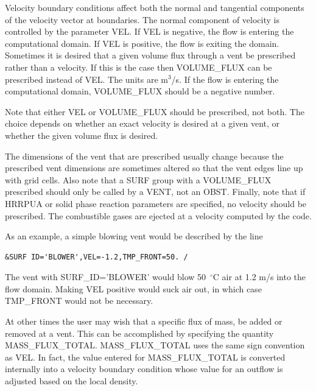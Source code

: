 \documentclass[11pt]{book}
\begin{document}
Velocity boundary conditions affect both the normal and tangential
components of the velocity vector at boundaries.
The normal component of velocity is controlled by the parameter
{\ct VEL}. If {\ct VEL} is negative, the flow is entering the
computational domain. If {\ct VEL} is positive, the flow is exiting the
domain.
Sometimes it is desired that a given volume flux through a vent
be prescribed rather than a velocity. If this is the case then
{\ct VOLUME\_FLUX} can be prescribed instead of {\ct VEL}. The units
are m$^3$/s.
If the flow is entering the computational domain, {\ct VOLUME\_FLUX}
should be a negative number.
\begin{warning}
\noindent
Note that either {\ct VEL} or {\ct VOLUME\_FLUX} should be prescribed,
not both.  The choice depends on whether an exact velocity is desired at a
given vent, or whether the given volume flux is desired.
\end{warning}
The dimensions of the vent that are prescribed usually change
because the prescribed vent dimensions are sometimes altered so that
the vent edges line up with grid cells. Also note that a {\ct SURF}
group with a {\ct VOLUME\_FLUX} prescribed should only be called by a
{\ct VENT}, not an {\ct OBST}.
Finally, note that if {\ct HRRPUA} or solid phase reaction parameters are
specified, no velocity should be prescribed. The combustible gases
are ejected at a velocity computed by the code.

As an example, a simple blowing vent would be described by the line

\footnotesize
\begin{verbatim}
&SURF ID='BLOWER',VEL=-1.2,TMP_FRONT=50. /
\end{verbatim}
\normalsize

\noindent
The vent with {\ct SURF\_ID='BLOWER'} would blow 50~$^\circ$C
air at 1.2 m/s into the flow domain. Making {\ct VEL} positive would
suck air out, in which case {\ct TMP\_FRONT} would not be necessary.

At other times the user may wish that a specific flux of mass, be added or removed at
a vent.  This can be accomplished by specifying the quantity {\ct MASS\_FLUX\_TOTAL}.
{\ct MASS\_FLUX\_TOTAL} uses the same sign convention as {\ct VEL}.  In fact, the value entered for
{\ct MASS\_FLUX\_TOTAL} is converted internally into a velocity boundary condition whose value
for an outflow is adjusted based on the local density.
\end{document}
